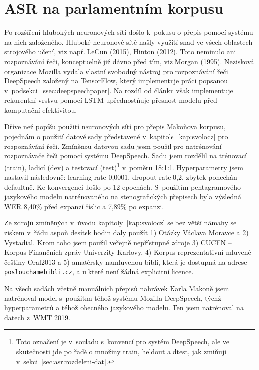 \section{ASR na parlamentním korpusu}
\label{sec:csasr:results}

Po rozšíření hlubokých neuronových sítí došlo k~pokusu o přepis pomocí systému
na nich založeného. 
Hluboké neuronové sítě našly využití
snad ve všech oblastech strojového učení, viz např. LeCun
(2015)\cite{lecun2015deep}, Hinton (2012)\cite{hinton2012deep}. Toto neminulo ani
rozpoznávání řeči, konceptuelně již dávno před tím, viz Morgan
(1995)\cite{morgan1995neural}.
Nezisková organizace Mozilla vydala vlastní svobodný nástroj pro rozpoznávání
řeči DeepSpeech\cite{hannun2014deep} založený na
TensorFlow\cite{abadi2016tensorflow}, který implementuje práci popsanou
v~podsekci~\ref{ssec:deepspeechpaper}.
Na rozdíl od článku\cite{hannun2014deep} však implementuje rekurentní vrstvu
pomocí LSTM upřednostňuje přesnost modelu před komputační efektivitou.

Dříve než popíšu použití neuronových sítí pro přepis Makoňova korpusu,  pojednám
o použití datové sady představené v~kapitole~\ref{kap:svolocz} pro rozpoznávání
řeči.
Zmíněnou datovou sadu jsem použil pro natrénování rozpoznávače řeči pomocí
systému DeepSpeech. Sadu jsem
rozdělil na trénovací (train), ladicí (dev) a testovací (test)\footnote{Toto
označení je v~souladu s~konvencí pro systém DeepSpeech, ale ve skutečnosti jde
po řadě o množiny train, heldout a dtest, jak zmiňuji v~sekci~\ref{sec:asr:rozdeleni-dat}.} v~poměru 18:1:1.
Hyperparametry jsem nastavil následovně: learning rate 0,0001, dropout rate 0,2,
zbytek ponechán defaultně. Ke konvergenci došlo po 12 epochách.
S~použitím pentagramového jazykového modelu natrénovaného na
stenografických přepisech byla výsledná WER 8,40\% před expanzí číslic a 7,89\% po expanzi.

Ze zdrojů zmíněných v~úvodu kapitoly~\ref{kap:svolocz} se bez větší námahy se ziskem v~řádu
aspoň desítek hodin daly použít 1) Otázky Václava Moravce a 2) Vystadial. Krom
toho jsem použil veřejně nepřístupné zdroje 3) CUCFN -- Korpus Finančních zpráv
Univerzity Karlovy, 4) Korpus reprezentativní mluvené češtiny
Oral2013\cite{oral2013} a 5) amatérsky namluvenou bibli, která je dostupná na adrese
\texttt{poslouchamebibli.cz}, a u které není žádná explicitní licence.

Na všech sadách včetně manuálních přepisů nahrávek Karla Makoně jsem natrénoval
model s~použitím téhož systému Mozilla DeepSpeech, týchž hyperparametrů a téhož
obecného jazykového modelu. Ten jsem natrénoval na datech z~WMT
2019\cite{wmt19}.

